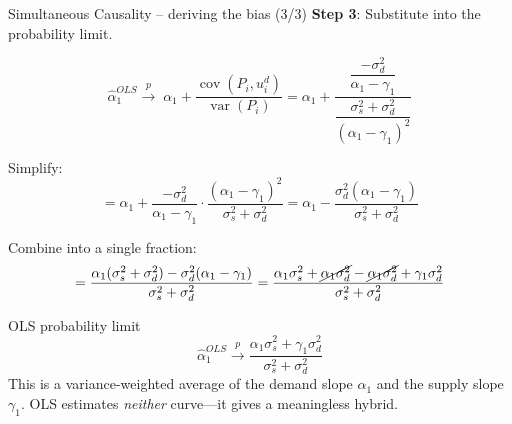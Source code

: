 \documentclass[10pt]{beamer}
\begin{document}
\begin{frame}{Simultaneous Causality -- deriving the bias (3/3)}
\textbf{Step 3}: Substitute into the probability limit.

\[
\widehat{\alpha}_1^{OLS} \xrightarrow{p}\; \alpha_1 + \frac{\operatorname{cov}(P_i, u_i^d)}{\operatorname{var}(P_i)} = \alpha_1 + \frac{\dfrac{-\sigma_d^2}{\alpha_1 - \gamma_1}}{\dfrac{\sigma_s^2 + \sigma_d^2}{(\alpha_1 - \gamma_1)^2}}
\]

\pause
Simplify:
\[
= \alpha_1 + \frac{-\sigma_d^2}{\alpha_1 - \gamma_1} \cdot \frac{(\alpha_1 - \gamma_1)^2}{\sigma_s^2 + \sigma_d^2} = \alpha_1 - \frac{\sigma_d^2(\alpha_1 - \gamma_1)}{\sigma_s^2 + \sigma_d^2}
\]

\pause
Combine into a single fraction:
\[
= \frac{\alpha_1(\sigma_s^2 + \sigma_d^2) - \sigma_d^2(\alpha_1 - \gamma_1)}{\sigma_s^2 + \sigma_d^2} = \frac{\alpha_1 \sigma_s^2 + \cancel{\alpha_1 \sigma_d^2} - \cancel{\alpha_1\sigma_d^2} + \gamma_1\sigma_d^2}{\sigma_s^2 + \sigma_d^2}
\]

\pause
\begin{block}{OLS probability limit}
\[
\widehat{\alpha}_1^{OLS} \xrightarrow{p} \frac{\alpha_1 \sigma_s^2 + \gamma_1 \sigma_d^2}{\sigma_s^2 + \sigma_d^2}
\]
This is a \alert{variance-weighted average} of the demand slope $\alpha_1$ and the supply slope $\gamma_1$. OLS estimates \emph{neither} curve---it gives a meaningless hybrid.
\end{block}
\end{frame}
\end{document}
